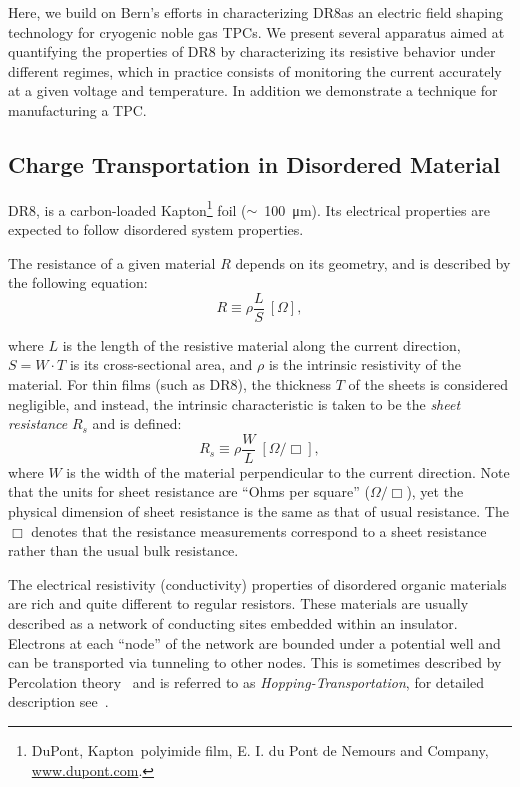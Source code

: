 \documentclass[a4paper,12pt]{article}
\newcommand{\DR}{DR8}
\begin{document}
Here, we build on Bern's efforts in characterizing \DR as an electric field shaping technology for cryogenic noble gas TPCs.
We present several apparatus aimed at quantifying the properties of {\DR} by characterizing its resistive behavior under different regimes, which in practice consists of monitoring the current accurately at a given voltage and temperature. 
In addition we demonstrate a technique for manufacturing a TPC.

\subsection{Charge Transportation in Disordered Material}
\label{sec:disorder_Mattrial}

{\DR}, is a carbon-loaded Kapton\footnote{DuPont\texttrademark, Kapton\textregistered \, polyimide film, E. I. du Pont de Nemours and Company, \url{www.dupont.com}.} foil ($\sim$~\SI{100}{\micro\metre}). 
Its electrical properties are expected to follow disordered system properties. 

The resistance of a given material $R$ depends on its geometry, and is described by the following equation:
\begin{equation}
\label{eq:Res_3D}
R \equiv \rho \frac{L}{S} \ [\Omega],
\end{equation}

where $L$ is the length of the resistive material along the current direction, $S = W \cdot T$ is its cross-sectional area, and $\rho$ is the intrinsic resistivity of the material. 
For thin films (such as {\DR}), the thickness $T$ of the sheets is considered negligible, and instead, the intrinsic characteristic is taken to be the \emph{sheet resistance} $R_s$ and is defined:
\begin{equation}
\label{eq:res_2D}
R_s \equiv \rho \frac{W}{L} \ [\Omega / \Box],
\end{equation}
where $W$ is the width of the material perpendicular to the current direction. 
Note that the units for sheet resistance are ``Ohms per square'' ($\Omega / \Box$), yet the physical dimension of sheet resistance is the same as that of usual resistance. 
The $\Box$ denotes that the resistance measurements correspond to a sheet resistance rather than the usual bulk resistance.

The electrical resistivity (conductivity) properties of disordered organic materials are rich and quite different to regular resistors. 
These materials are usually described as a network of conducting sites embedded within an insulator. 
Electrons at each ``node'' of the network are bounded under a potential well and can be transported via tunneling to other nodes. 
This is sometimes described by Percolation theory~\cite{Havlin1996} and is referred to as \emph{Hopping-Transportation}, for detailed description see~\cite{organicDisorderMaterial,electronicPhotonicMaterials}.
\end{document}
